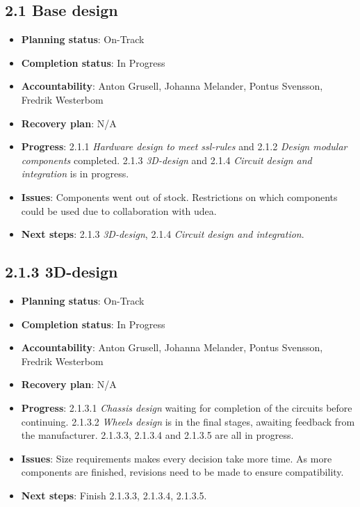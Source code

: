 
\subsection*{2.1 Base design}
\begin{itemize}
    \item \textbf{Planning status}: On-Track
    \item \textbf{Completion status}: In Progress
    \item \textbf{Accountability}: Anton Grusell, Johanna Melander, Pontus Svensson, Fredrik Westerbom
    \item \textbf{Recovery plan}: N/A
    \item \textbf{Progress}: 2.1.1 \textit{Hardware design to meet \acs{ssl}-rules} and 2.1.2 \textit{Design modular components} completed. 2.1.3 \textit{3D-design} and 2.1.4 \textit{Circuit design and integration} is in progress.
    \item \textbf{Issues}: Components went out of stock. Restrictions on which components could be used due to collaboration with \ac{udea}.
    \item \textbf{Next steps}: 2.1.3 \textit{3D-design}, 2.1.4 \textit{Circuit design and integration}.
\end{itemize}


\subsection*{2.1.3 3D-design}
\begin{itemize}
    \item \textbf{Planning status}: On-Track
    \item \textbf{Completion status}: In Progress
    \item \textbf{Accountability}: Anton Grusell, Johanna Melander, Pontus Svensson, Fredrik Westerbom
    \item \textbf{Recovery plan}: N/A
    \item \textbf{Progress}: 2.1.3.1 \textit{Chassis design} waiting for completion of the circuits before continuing. 2.1.3.2 \textit{Wheels design} is in the final stages, awaiting feedback from the manufacturer. 2.1.3.3, 2.1.3.4 and 2.1.3.5 are all in progress. 
    \item \textbf{Issues}: Size requirements makes every decision take more time. As more components are finished, revisions need to be made to ensure compatibility.
    \item \textbf{Next steps}: Finish 2.1.3.3, 2.1.3.4, 2.1.3.5.
\end{itemize}

